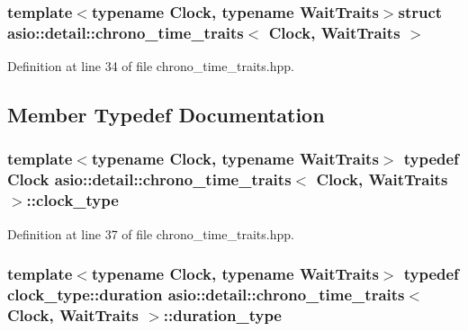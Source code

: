 \subsubsection*{template$<$typename Clock, typename Wait\+Traits$>$struct asio\+::detail\+::chrono\+\_\+time\+\_\+traits$<$ Clock, Wait\+Traits $>$}



Definition at line 34 of file chrono\+\_\+time\+\_\+traits.\+hpp.



\subsection{Member Typedef Documentation}
\hypertarget{structasio_1_1detail_1_1chrono__time__traits_a0043b268ffdb59f6b880a96512ab5453}{}
\subsubsection[{clock\+\_\+type}]{\setlength{\rightskip}{0pt plus 5cm}template$<$typename Clock, typename Wait\+Traits$>$ typedef Clock {\bf asio\+::detail\+::chrono\+\_\+time\+\_\+traits}$<$ Clock, Wait\+Traits $>$\+::{\bf clock\+\_\+type}}\label{structasio_1_1detail_1_1chrono__time__traits_a0043b268ffdb59f6b880a96512ab5453}


Definition at line 37 of file chrono\+\_\+time\+\_\+traits.\+hpp.

\hypertarget{structasio_1_1detail_1_1chrono__time__traits_a7f122a7cb603e7516bb6595016960775}{}
\subsubsection[{duration\+\_\+type}]{\setlength{\rightskip}{0pt plus 5cm}template$<$typename Clock, typename Wait\+Traits$>$ typedef clock\+\_\+type\+::duration {\bf asio\+::detail\+::chrono\+\_\+time\+\_\+traits}$<$ Clock, Wait\+Traits $>$\+::{\bf duration\+\_\+type}}\label{structasio_1_1detail_1_1chrono__time__traits_a7f122a7cb603e7516bb6595016960775}



